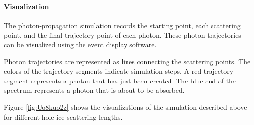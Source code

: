 \paragraph{Visualization}
The photon-propagation simulation records the starting point, each scattering point, and the final trajectory point of each photon. These photon trajectories can be visualized using the  event display software.

Photon trajectories are represented as lines connecting the scattering points. The colors of the trajectory segments indicate simulation steps. A red trajectory segment represents a photon that has just been created. The blue end of the spectrum represents a photon that is about to be absorbed.

Figure \ref{fig:Uo8kuo2z} shows the  visualizations of the simulation described above for different hole-ice scattering lengths.


